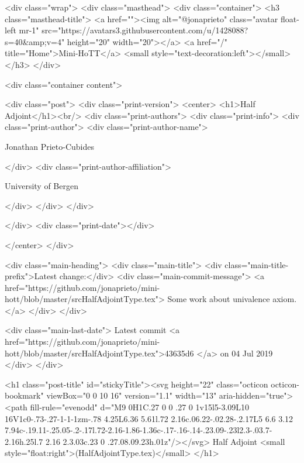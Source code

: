     <div class="wrap">
      <div class="masthead">
        <div class="container">
          <h3 class="masthead-title">
            <a href=""><img alt="@jonaprieto" class="avatar float-left mr-1" src="https://avatars3.githubusercontent.com/u/1428088?s=40&amp;v=4" height="20" width="20"></a>
            <a href="/" title="Home">Mini-HoTT</a>
            <small style="text-decoration:left"></small>
          </h3>
        </div>
      
      <div class="container content">
        







<div class="post">
  <div class="print-version">
    <center>
      <h1>Half Adjoint</h1><br/>
        <div class="print-authors">
          <div class="print-info">
            <div class="print-author">
              <div class="print-author-name">
                
                  Jonathan Prieto-Cubides
                
              </div>
              <div class="print-author-affiliation">
                
                  University of Bergen
                
                </div>
            </div>
          </div>
          
          
        </div>
        <div class="print-date"></div>
        
        
    </center>
  </div>

  
  <div class="main-heading">
    <div class="main-title">
      <div class="main-title-prefix">Latest change:</div>
      <div class="main-commit-message">
            <a href="https://github.com/jonaprieto/mini-hott/blob/master/srcHalfAdjointType.tex">
              Some work about univalence axiom.</a>
      </div>
    </div>

    <div class="main-last-date">
      Latest commit <a href="https://github.com/jonaprieto/mini-hott/blob/master/srcHalfAdjointType.tex">43635d6 </a> on  04 Jul 2019
    </div>
  </div>
  

  <h1 class="post-title" id="stickyTitle"><svg height="22" class="octicon octicon-bookmark" viewBox="0 0 10 16" version="1.1" width="13" aria-hidden="true"><path fill-rule="evenodd" d="M9 0H1C.27 0 0 .27 0 1v15l5-3.09L10 16V1c0-.73-.27-1-1-1zm-.78 4.25L6.36 5.61l.72 2.16c.06.22-.02.28-.2.17L5 6.6 3.12 7.94c-.19.11-.25.05-.2-.17l.72-2.16-1.86-1.36c-.17-.16-.14-.23.09-.23l2.3-.03.7-2.16h.25l.7 2.16 2.3.03c.23 0 .27.08.09.23h.01z"/></svg> Half Adjoint <small style="float:right">(HalfAdjointType.tex)</small>
  </h1>

